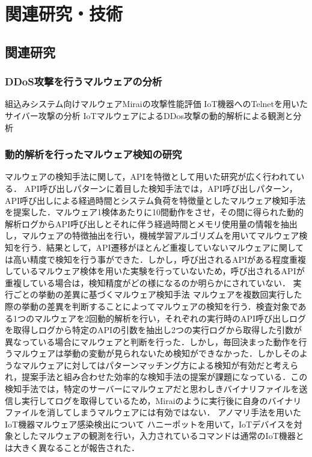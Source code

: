 \chapter{関連研究・技術}
 
\section{関連研究}

\subsection{DDoS攻撃を行うマルウェアの分析}
	組込みシステム向けマルウェアMiraiの攻撃性能評価
    IoT機器へのTelnetを用いたサイバー攻撃の分析
    IoTマルウェアによるDDos攻撃の動的解析による観測と分析    
\subsection{動的解析を行ったマルウェア検知の研究} %

マルウェアの検知手法に関して，APIを特徴として用いた研究が広く行われている．
API呼び出しパターンに着目した検知手法では，API呼び出しパターン，API呼び出しによる経過時間とシステム負荷を特徴量としたマルウェア検知手法を提案した．マルウェア1検体あたりに10間動作をさせ，その間に得られた動的解析ログからAPI呼び出しとそれに伴う経過時間とメモリ使用量の情報を抽出し，マルウェアの特徴抽出を行い，機械学習アルゴリズムを用いてマルウェア検知を行う．結果として，API遷移がほとんど重複していないマルウェアに関しては高い精度で検知を行う事ができた．しかし，呼び出されるAPIがある程度重複しているマルウェア検体を用いた実験を行っていないため，呼び出されるAPIが重複している場合は，検知精度がどの様になるのか明らかにされていない．
実行ごとの挙動の差異に基づくマルウェア検知手法
マルウェアを複数回実行した際の挙動の差異を判断することによってマルウェアの検知を行う．検査対象である1つのマルウェアを2回動的解析を行い，それぞれの実行時のAPI呼び出しログを取得しログから特定のAPIの引数を抽出し2つの実行ログから取得した引数が異なっている場合にマルウェアと判断を行った．しかし，毎回決まった動作を行うマルウェアは挙動の変動が見られないため検知ができなかった．しかしそのようなマルウェアに対してはパターンマッチング方による検知が有効だと考えられ，提案手法と組み合わせた効率的な検知手法の提案が課題になっている．この検知手法では，特定のサーバーにマルウェアだと思わしきバイナリファイルを送信し実行してログを取得しているため，Miraiのように実行後に自身のバイナリファイルを消してしまうマルウェアには有効ではない．
アノマリ手法を用いたIoT機器マルウェア感染検出について
ハニーポットを用いて，IoTデバイスを対象としたマルウェアの観測を行い，入力されているコマンドは通常のIoT機器とは大きく異なることが報告された．

